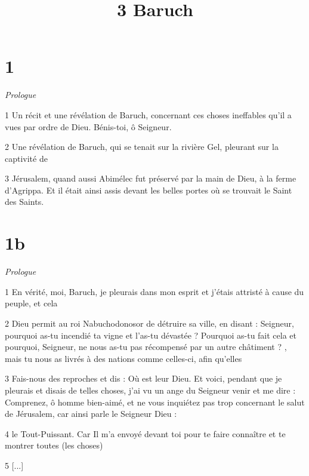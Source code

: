 

\title{3 Baruch}

\chapter{1}

\par \textit{Prologue}

\par 1 Un récit et une révélation de Baruch, concernant ces choses ineffables qu'il a vues par ordre de Dieu. Bénis-toi, ô Seigneur.

\par 2 Une révélation de Baruch, qui se tenait sur la rivière Gel, pleurant sur la captivité de

\par 3 Jérusalem, quand aussi Abimélec fut préservé par la main de Dieu, à la ferme d'Agrippa. Et il était ainsi assis devant les belles portes où se trouvait le Saint des Saints.

\chapter{1b}

\par \textit{Prologue}

\par 1 En vérité, moi, Baruch, je pleurais dans mon esprit et j'étais attristé à cause du peuple, et cela

\par 2 Dieu permit au roi Nabuchodonosor de détruire sa ville, en disant : Seigneur, pourquoi as-tu incendié ta vigne et l'as-tu dévastée ? Pourquoi as-tu fait cela et pourquoi, Seigneur, ne nous as-tu pas récompensé par un autre châtiment ? , mais tu nous as livrés à des nations comme celles-ci, afin qu'elles

\par 3 Fais-nous des reproches et dis : Où est leur Dieu. Et voici, pendant que je pleurais et disais de telles choses, j'ai vu un ange du Seigneur venir et me dire : Comprenez, ô homme bien-aimé, et ne vous inquiétez pas trop concernant le salut de Jérusalem, car ainsi parle le Seigneur Dieu :

\par 4 le Tout-Puissant. Car Il m'a envoyé devant toi pour te faire connaître et te montrer toutes (les choses)

\par 5 [...]

